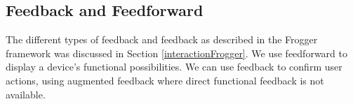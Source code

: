 %

%


\subsection{Feedback and Feedforward}
\label{section:feedbackAndFeedforward}

The different types of feedback and feedback as described in the Frogger framework was discussed in Section \ref{interactionFrogger}. We use feedforward to display a device's functional possibilities. We can use feedback to confirm user actions, using augmented feedback where direct functional feedback is not available.

